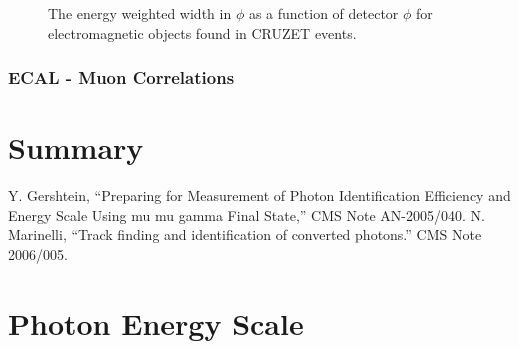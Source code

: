 \documentclass{cmspaper}
\begin{document}
\begin{figure}[hbtp]
  \begin{center}
    \caption{The energy weighted width in $\phi$ as a function of detector $\phi$ for electromagnetic objects found in
CRUZET events.}
    \label{fig:CRUZETPhiWidPhi}
  \end{center}
\end{figure}

\subsubsection{ECAL - Muon Correlations}


\section{Summary}

\begin{thebibliography}{9}
  Y. Gershtein, ``Preparing for Measurement of Photon Identification Efficiency and Energy Scale Using mu mu gamma Final State,'' CMS Note AN-2005/040. 
  N. Marinelli, ``Track finding and identification of converted photons.''  CMS Note 2006/005.


\end{thebibliography}
 
\pagebreak
\appendix
\section{Photon Energy Scale}
\end{document}

